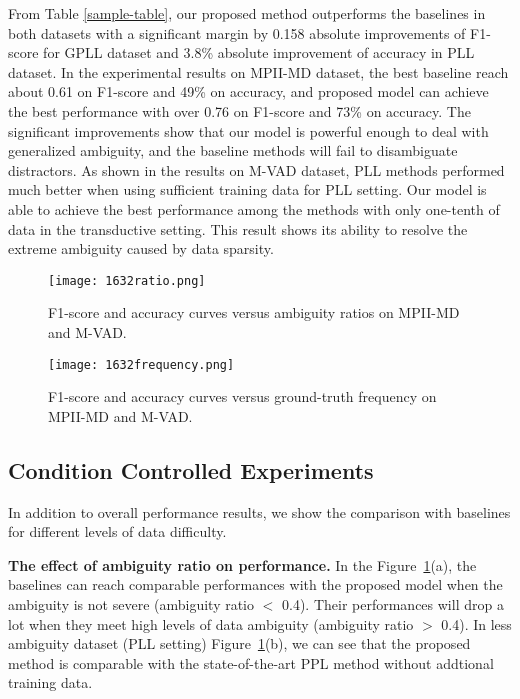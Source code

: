 \documentclass[letterpaper]{article} \usepackage{aaai20}  \usepackage{times}  \usepackage{helvet} \usepackage{courier}  \usepackage[hyphens]{url}  \usepackage{graphicx} \urlstyle{rm} \def\UrlFont{\rm}  \frenchspacing  \setlength{\pdfpagewidth}{8.5in}  \setlength{\pdfpageheight}{11in}  \frenchspacing
\begin{document}
From Table \ref{sample-table}, our proposed method outperforms the baselines in both datasets with a significant margin by 0.158 absolute improvements of F1-score for GPLL dataset and 3.8\% absolute improvement of accuracy in PLL dataset. In the experimental results on MPII-MD dataset, the best baseline reach about 0.61 on F1-score and 49\% on accuracy, and proposed model can achieve the best performance with over 0.76 on F1-score and 73\% on accuracy. The significant improvements show that our model is powerful enough to deal with generalized ambiguity, and the baseline methods will fail to disambiguate distractors. As shown in the results on M-VAD dataset, PLL methods performed much better when using sufficient training data for PLL setting. Our model is able to achieve the best performance among the methods with only one-tenth of data in the transductive setting. This result shows its ability to resolve the extreme ambiguity caused by data sparsity.


\begin{figure}[!th]
 \centering
  \texttt{[image: 1632ratio.png]}
\caption{F1-score and accuracy curves versus ambiguity ratios on MPII-MD and M-VAD. }
  \label{fig:ratio}
\end{figure}


\begin{figure}[!th]
\centering
 
  \texttt{[image: 1632frequency.png]}
  \caption{F1-score and accuracy curves versus ground-truth frequency on MPII-MD and M-VAD.}
  \label{fig:freq}
\end{figure}


\subsection{Condition Controlled Experiments}


In addition to overall performance results, we show the comparison with baselines for different levels of data difficulty. 

\noindent\textbf{The effect of ambiguity ratio on performance.}
In the Figure~\ref{fig:ratio}(a), the baselines can reach comparable performances with the proposed model when the ambiguity is not severe (ambiguity ratio $<$ 0.4). Their performances will drop a lot when they meet high levels of data ambiguity (ambiguity ratio $>$ 0.4). In less ambiguity dataset (PLL setting) Figure~\ref{fig:ratio}(b), we can see that the proposed method is comparable with the state-of-the-art PPL method without addtional training data. 
\end{document}
